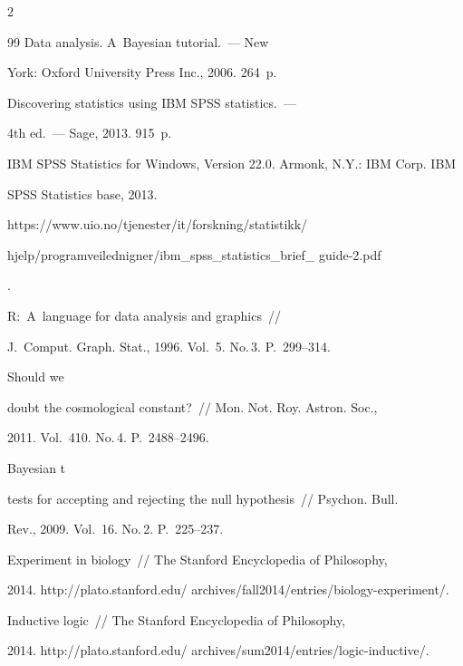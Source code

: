 \begin{multicols}{2}
{{\begin{thebibliography}{99}
 Data analysis. A~Bayesian tutorial.~--- New


York: Oxford University Press Inc., 2006.  264~p.




 Discovering statistics using IBM SPSS statistics.~---


4th ed.~--- Sage, 2013.  915~p.




IBM SPSS Statistics for Windows, Version 22.0. Armonk, N.Y.: IBM Corp. IBM


SPSS Statistics base, 2013.


{\sf


https://www.uio.no/tjenester/it/forskning/statistikk/


hjelp/programveilednigner/ibm\_spss\_statistics\_brief\_ guide-2.pdf}.







 R:~A~language for data analysis and graphics~//


J.~Comput. Graph. Stat., 1996. Vol.~5. No.\,3. P.~299--314.




 Should we


doubt the cosmological constant?~// Mon. Not. Roy. Astron. Soc.,


2011. Vol.~410. No.\,4. P.~2488--2496.




 Bayesian t


tests for accepting and rejecting the null hypothesis~// Psychon. Bull.


Rev., 2009.  Vol.~16. No.\,2. P.~225--237.




 Experiment in biology~// The Stanford Encyclopedia of Philosophy,


2014. {\sf  http://plato.stanford.edu/ archives/fall2014/entries/biology-experiment/}.




 Inductive logic~// The Stanford Encyclopedia of Philosophy,


2014. {\sf http://plato.stanford.edu/ archives/sum2014/entries/logic-inductive/}.



\end{thebibliography}}}
\end{multicols}
